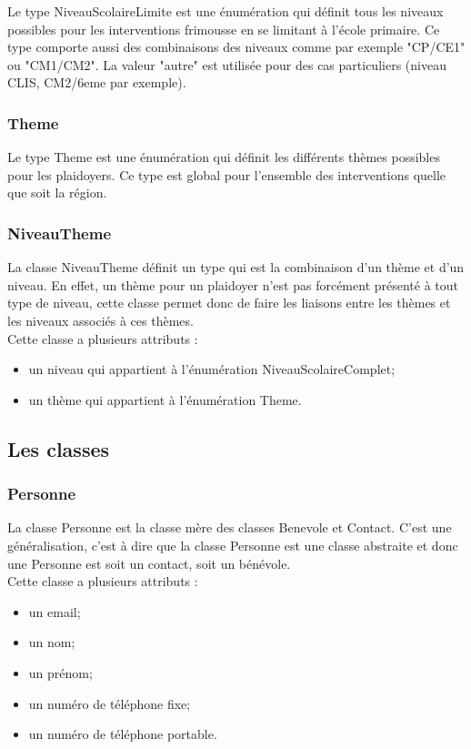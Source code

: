 Le type NiveauScolaireLimite est une énumération qui définit tous les niveaux possibles pour les interventions frimousse en se limitant à l'école primaire. Ce type comporte aussi des combinaisons des niveaux comme par exemple "CP/CE1" ou "CM1/CM2". La valeur "autre" est utilisée pour des cas particuliers (niveau CLIS, CM2/6eme par exemple).

\subsubsection*{Theme}

Le type Theme est une énumération qui définit les différents thèmes possibles pour les plaidoyers. Ce type est global pour l'ensemble des interventions quelle que soit la région.  

\subsubsection*{NiveauTheme}

La classe NiveauTheme définit un type qui est la combinaison d'un thème et d'un niveau. En effet, un thème pour un plaidoyer n'est pas forcément présenté à tout type de niveau, cette classe permet donc de faire les liaisons entre les thèmes et les niveaux associés à ces thèmes.\\
Cette classe a plusieurs attributs : 
\begin{itemize}
\item un niveau qui appartient à l'énumération NiveauScolaireComplet;
\item un thème qui appartient à l'énumération Theme.
\end{itemize}


\subsection{Les classes}

\subsubsection*{Personne}

La classe Personne est la classe mère des classes Benevole et Contact. C'est une généralisation, c'est à dire que la classe Personne est une classe abstraite et donc une Personne est soit un contact, soit un bénévole. \\
Cette classe a plusieurs attributs : 
\begin{itemize}
\item un email;
\item un nom;
\item un prénom;
\item un numéro de téléphone fixe;
\item un numéro de téléphone portable.
\end{itemize}

